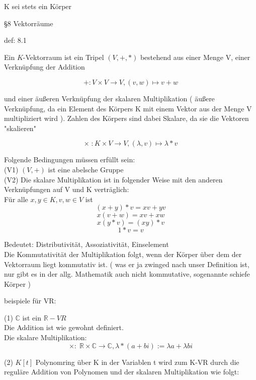 \documentclass[smallheadings,12pt,a4paper]{scrartcl}
\begin{document}
\item K sei stets ein Körper \\

\begin{center}
\item[§8 Vektorräume]
\end{center}

\item[def: 8.1]
\item Ein $K$-Vektorraum ist ein Tripel $(V,+,*)$ bestehend aus einer Menge V, einer Verknüpfung der Addition

$$ +:V \times V \rightarrow V, (v,w) \mapsto v+w $$ 

und einer äußeren Verknüpfung der skalaren Multiplikation ( äußere Verknüpfung, da ein Element des Körpers K mit einem Vektor aus der Menge V multipliziert wird ). Zahlen des Körpers sind dabei Skalare, da sie die Vektoren "skalieren"

$$ \times \; : K \times V \rightarrow V , ( \lambda , v ) \mapsto \lambda * v $$

Folgende Bedingungen müssen erfüllt sein: \\

(V1) $(V,+)$ ist eine abelsche Gruppe \\
(V2) Die skalare Multiplikation ist in folgender Weise mit den anderen Verknüpfungen auf V und K verträglich: \\

Für alle $x,y \in K , v,w \in V $ ist  \\
$$ (x+y) * v = xv+yv $$
$$ x(v+w) = xv+xw $$
$$ x(y*v) = (xy)*v $$
$$ 1*v=v$$

Bedeutet: Distributivität, Assoziativität, Einselement \\
Die Kommutativität der Multiplikation folgt, wenn der Körper über dem der Vektorraum liegt kommutativ ist. ( was er ja zwinged nach unser Definition ist, nur gibt es in der allg. Mathematik auch nicht kommutative, sogenannte schiefe Körper )


\item[beispiele für VR:]

(1) $\mathbb{C}$ ist ein $\mathbb{R}-VR$ \\
Die Addition ist wie gewohnt definiert. \\
Die skalare Multiplikation: 
$$ \times : \; \mathbb{R} \times \mathbb{C} \rightarrow \mathbb{C}, \lambda * (a+bi):= \lambda a + \lambda b i $$

(2) $K[t]$ Polynomring über K in der Variablen t wird zum K-VR durch die reguläre Addition von Polynomen und der skalaren Multiplikation wie folgt:
\end{document}
